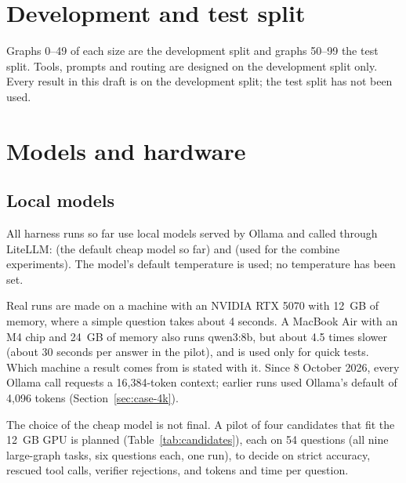 \section{Development and test split}

Graphs 0--49 of each size are the development split and graphs 50--99 the test split. Tools, prompts and routing are
designed on the development split only. Every result in this draft is on the development split; the test split has
not been used.

\section{Models and hardware}

\subsection{Local models}

All harness runs so far use local models served by Ollama and called through LiteLLM:  (the default
cheap model so far) and  (used for the combine experiments). The model's default temperature is used;
no temperature has been set.

Real runs are made on a machine with an NVIDIA RTX 5070 with 12~GB of memory, where a simple question takes about 4
seconds. A MacBook Air with an M4 chip and 24~GB of memory also runs qwen3:8b, but about 4.5 times slower (about 30
seconds per answer in the pilot), and is used only for quick tests. Which machine a result comes from is stated with
it. Since 8 October 2026, every Ollama call requests a 16,384-token context; earlier runs used Ollama's default of
4,096 tokens (Section~\ref{sec:case-4k}).

The choice of the cheap model is not final. A pilot of four candidates that fit the 12~GB GPU is planned
(Table~\ref{tab:candidates}), each on 54 questions (all nine large-graph tasks, six questions each, one run), to
decide on strict accuracy, rescued tool calls, verifier rejections, and tokens and time per question.

